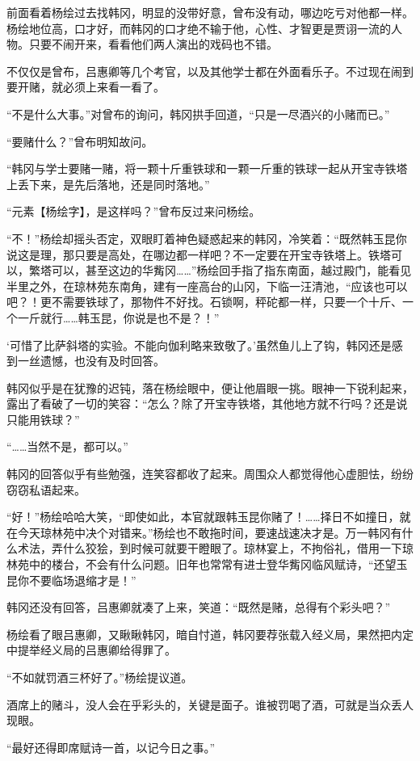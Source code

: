 前面看着杨绘过去找韩冈，明显的没带好意，曾布没有动，哪边吃亏对他都一样。杨绘地位高，口才好，而韩冈的口才绝不输于他，心性、才智更是贾诩一流的人物。只要不闹开来，看看他们两人演出的戏码也不错。

不仅仅是曾布，吕惠卿等几个考官，以及其他学士都在外面看乐子。不过现在闹到要开赌，就必须上来看一看了。

“不是什么大事。”对曾布的询问，韩冈拱手回道，“只是一尽酒兴的小赌而已。”

“要赌什么？”曾布明知故问。

“韩冈与学士要赌一赌，将一颗十斤重铁球和一颗一斤重的铁球一起从开宝寺铁塔上丢下来，是先后落地，还是同时落地。”

“元素【杨绘字】，是这样吗？”曾布反过来问杨绘。

“不！”杨绘却摇头否定，双眼盯着神色疑惑起来的韩冈，冷笑着：“既然韩玉昆你说这是理，那只要是高处，在哪边都一样吧？不一定要在开宝寺铁塔上。铁塔可以，繁塔可以，甚至这边的华觜冈……”杨绘回手指了指东南面，越过殿门，能看见半里之外，在琼林苑东南角，建有一座高台的山冈，下临一汪清池，“应该也可以吧？！更不需要铁球了，那物件不好找。石锁啊，秤砣都一样，只要一个十斤、一个一斤就行……韩玉昆，你说是也不是？！”

‘可惜了比萨斜塔的实验。不能向伽利略来致敬了。’虽然鱼儿上了钩，韩冈还是感到一丝遗憾，也没有及时回答。

韩冈似乎是在犹豫的迟钝，落在杨绘眼中，便让他眉眼一挑。眼神一下锐利起来，露出了看破了一切的笑容：“怎么？除了开宝寺铁塔，其他地方就不行吗？还是说只能用铁球？”

“……当然不是，都可以。”

韩冈的回答似乎有些勉强，连笑容都收了起来。周围众人都觉得他心虚胆怯，纷纷窃窃私语起来。

“好！”杨绘哈哈大笑，“即使如此，本官就跟韩玉昆你赌了！……择日不如撞日，就在今天琼林苑中决个对错来。”杨绘也不敢拖时间，要速战速决才是。万一韩冈有什么术法，弄什么狡狯，到时候可就要干瞪眼了。琼林宴上，不拘俗礼，借用一下琼林苑中的楼台，不会有什么问题。旧年也常常有进士登华觜冈临风赋诗，“还望玉昆你不要临场退缩才是！”

韩冈还没有回答，吕惠卿就凑了上来，笑道：“既然是赌，总得有个彩头吧？”

杨绘看了眼吕惠卿，又瞅瞅韩冈，暗自忖道，韩冈要荐张载入经义局，果然把内定中提举经义局的吕惠卿给得罪了。

“不如就罚酒三杯好了。”杨绘提议道。

酒席上的赌斗，没人会在乎彩头的，关键是面子。谁被罚喝了酒，可就是当众丢人现眼。

“最好还得即席赋诗一首，以记今日之事。”

